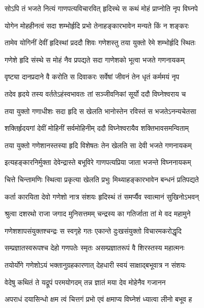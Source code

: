 \twolineshloka
{सोऽपि तं भजते नित्यं गाणपत्यविचारवित्}
{हृदिस्थे स कथं मोहं प्राप्नोति नृप विघ्नपे} %

\twolineshloka
{योगेन मोहहीनत्वं सदा शम्भोर्हृदि प्रभो}
{तेनाहङ्कारभावेन मन्यते किं न शङ्करः} %

\twolineshloka
{तामेव योगिनीं देवीं हृदिस्थां प्रददौ शिवः}
{गणेशस्तु तया युक्तो रेमे शम्भोर्हृदि स्थितः} %

\twolineshloka
{गणेशे हृदि संस्थे स मोहं नैव प्रपद्यते}
{सदा गाणेशको भूत्वा भजते गणनायकम्} %

\twolineshloka
{वृष्ट्या दानप्रदाने वै करोति स दिवाकरः}
{सर्वेषां जीवनं तेन धृतं कर्ममयं नृप} %

\twolineshloka
{तदेव हृदये तस्य वर्ततेऽहंस्वभावतः}
{तां सञ्जीवनिकां सूर्यो ददौ विघ्नेश्वराय च} %

\twolineshloka
{तया युक्तो गणाधीशः सदा हृदि स खेलति}
{भानोस्तेन रविस्तं स भजतेऽनन्यचेतसा} %

\twolineshloka
{शक्तिर्हृदयगां देवीं मोहिनीं सर्वमोहिनीम्}
{ददौ विघ्नेश्वरायैव शक्तिभावसमन्विताम्} %

\twolineshloka
{तया युक्तो गणेशानस्तस्या हृदि विशेषतः}
{तेन खेलति सा देवी भजते गणनायकम्} %

\twolineshloka
{इत्यहङ्कारनिर्मुक्ता देवेन्द्रास्ते बभूविरे}
{गाणपत्यप्रिया जाता भजन्ते विघ्ननायकम्} %

\twolineshloka
{चित्ते चिन्तामणिः स्थित्वा प्रकृत्या खेलति प्रभुः}
{मिथ्याहङ्कारभावेन बन्धनं प्रतिपद्यते} %

\twolineshloka
{कर्ता कारयिता देवो गणेशो नात्र संशयः}
{हृदिस्थं तं समर्प्यैव स्वात्मानं सुखिनोऽभवन्} %


\twolineshloka
{श्रुत्वा दशरथो राजा जगाद मुनिसत्तमम्}
{चन्द्रस्य का गतिर्जाता तां मे वद महामुने} %


\twolineshloka
{गणेशशापसंयुक्तश्चन्द्रः स स्वगृहे गतः}
{एकान्ते दुःखसंयुक्तो विचारमकरोद्धृदि} %

\twolineshloka
{सम्प्रज्ञातस्वरूपश्च देहो गणपतेः स्मृतः}
{असम्प्रज्ञातरूपं वै शिरस्तस्य महात्मनः} %

\twolineshloka
{तयोर्योगे गणेशोऽयं भक्तानुग्रहकारणात्}
{देहधारी स्वयं साक्षाद्बभूवात्र न संशयः} %

\twolineshloka
{वेदेषु कथितं ते यद्रूपं परमयोगदम्}
{तन्न ज्ञातं मया देव मोहेनैव गजानन} %

\twolineshloka
{अपराधं दयासिन्धो क्षम त्वं चित्तगं प्रभो}
{एवं क्षमाप्य विघ्नेशं ध्यात्वा लीनो बभूव ह} %

